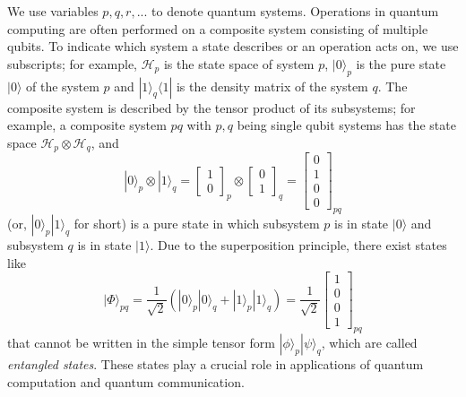\documentclass[conference,compsoc, 10pt]{IEEEtran}
\newcommand {\cH } {{\mathcal{H}}}
\def\>{\ensuremath{\rangle}}
\def\<{\ensuremath{\langle}}
\begin{document}
\begin{appendices}
		
		We use variables $p,q,r, ...$ to denote quantum systems. Operations in quantum
		computing are often performed on a composite system consisting of multiple
		qubits. To indicate which system a state describes or an operation acts on, we
		use subscripts; for example, $\cH_p$ is the state space of system $p$,
		$|0\>_{p}$ is the pure state $|0\>$ of the system $p$ and $|1\>_{q}\<1|$ is
		the density matrix of the system $q$. The composite system is described by the
		tensor product of its subsystems; for example, a composite system $pq$ with $p,q$ being single qubit systems has the
		state space $\cH_p\otimes\cH_q$, and 
		$$|0\>_p\otimes|1\>_q = \left[\begin{array}{c} 1 \\ 0\end{array} \right]_p\otimes\left[\begin{array}{c} 0 \\ 1\end{array} \right]_q = \left[\begin{array}{c} 0 \\ 1 \\ 0 \\ 0\end{array} \right]_{pq}$$
		(or, $|0\>_p|1\>_q$
		for short) is a pure state in which subsystem $p$ is in state $|0\>$ and
		subsystem $q$ is in state $|1\>$. Due to the superposition principle, there
		exist states like 
		\begin{equation}
		\label{ex-ent}
		|\Phi\>_{pq} =
		\frac{1}{\sqrt{2}}(|0\>_p|0\>_q+|1\>_p|1\>_q) = \frac{1}{\sqrt{2}}\left[\begin{array}{c} 1 \\ 0 \\ 0 \\ 1\end{array} \right]_{pq}
		\end{equation} that cannot be written in the
		simple tensor form $|\phi\>_p|\psi\>_q$, which are called \emph{entangled
			states}. These states play a crucial role in applications of quantum
		computation and quantum communication. 
		

\end{appendices}
\end{document}
